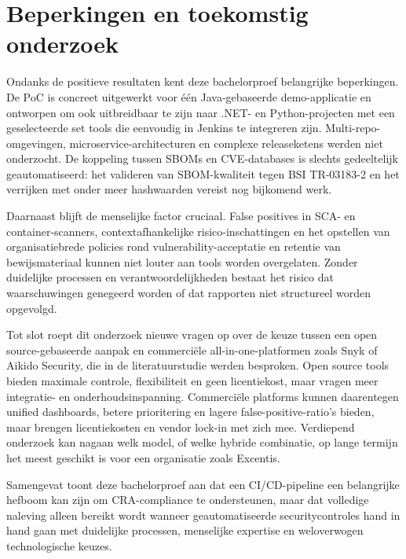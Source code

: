 \section{Beperkingen en toekomstig onderzoek}

Ondanks de positieve resultaten kent deze bachelorproef belangrijke beperkingen. De PoC is concreet uitgewerkt voor één Java-gebaseerde demo-applicatie en ontworpen om ook uitbreidbaar te zijn naar .NET- en Python-projecten met een geselecteerde set tools die eenvoudig in Jenkins te integreren zijn. Multi-repo-\\omgevingen, microservice-architecturen en complexe releaseketens werden niet onderzocht. De koppeling tussen SBOMs en CVE-databases is slechts gedeeltelijk geautomatiseerd: het valideren van SBOM-kwaliteit tegen BSI TR-03183-2 en het verrijken met onder meer hashwaarden vereist nog bijkomend werk.

Daarnaast blijft de menselijke factor cruciaal. False positives in SCA- en container-scanners, contextafhankelijke risico-inschattingen en het opstellen van organisatiebrede policies rond vulnerability-acceptatie en retentie van bewijsmateriaal kunnen niet louter aan tools worden overgelaten. Zonder duidelijke processen en verantwoordelijkheden bestaat het risico dat waarschuwingen genegeerd worden of dat rapporten niet structureel worden opgevolgd.

Tot slot roept dit onderzoek nieuwe vragen op over de keuze tussen een open source-gebaseerde aanpak en commerciële all-in-one-platformen zoals Snyk of Aikido Security, die in de literatuurstudie werden besproken. Open source tools bieden maximale controle, flexibiliteit en geen licentiekost, maar vragen meer\\integratie- en onderhoudsinspanning. Commerciële platforms kunnen daarentegen unified dashboards, betere prioritering en lagere false-positive-ratio's bieden, maar brengen licentiekosten en vendor lock-in met zich mee. Verdiepend onderzoek kan nagaan welk model, of welke hybride combinatie, op lange termijn het meest geschikt is voor een organisatie zoals Excentis.

Samengevat toont deze bachelorproef aan dat een CI/CD-pipeline een belangrijke hefboom kan zijn om CRA-compliance te ondersteunen, maar dat volledige naleving alleen bereikt wordt wanneer geautomatiseerde securitycontroles hand in hand gaan met duidelijke processen, menselijke expertise en weloverwogen technologische keuzes.
